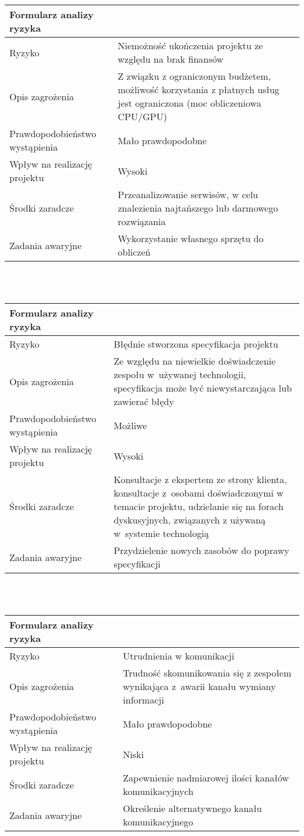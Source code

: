 \documentclass{article}
\begin{document}
\begin{tabular}{|L{6cm}|L{9cm}|}
\hline
Formularz analizy ryzyka &  \\
\hline
Ryzyko 						   & Niemożność ukończenia projektu ze względu na brak finansów \\
\hline
Opis zagrożenia				   & Z związku z ograniczonym budżetem, możliwość korzystania z płatnych usług jest ograniczona (moc obliczeniowa CPU/GPU) \\
\hline
Prawdopodobieństwo wystąpienia & Mało prawdopodobne \\
\hline
Wpływ na realizację projektu   & Wysoki \\
\hline
Środki zaradcze				   & Przeanalizowanie serwisów, w celu znalezienia najtańszego lub darmowego rozwiązania \\
\hline
Zadania awaryjne			   & Wykorzystanie własnego sprzętu do obliczeń \\
\hline
\end{tabular}

\mbox{}\\\mbox{}\\

\begin{tabular}{|L{6cm}|L{9cm}|}
\hline
Formularz analizy ryzyka &  \\
\hline
Ryzyko 						   & Błędnie stworzona specyfikacja projektu \\
\hline
Opis zagrożenia				   & Ze względu na niewielkie doświadczenie zespołu w~używanej technologii, specyfikacja może być niewystarczająca lub zawierać błędy \\
\hline
Prawdopodobieństwo wystąpienia & Możliwe \\
\hline
Wpływ na realizację projektu   & Wysoki \\
\hline
Środki zaradcze				   & Konsultacje z ekspertem ze strony klienta, konsultacje z~osobami doświadczonymi w temacie projektu, udzielanie się na forach dyskusyjnych, związanych z używaną w~systemie technologią \\
\hline
Zadania awaryjne			   & Przydzielenie nowych zasobów do poprawy specyfikacji \\
\hline
\end{tabular}

\mbox{}\\\mbox{}\\

\begin{tabular}{|L{6cm}|L{9cm}|}
\hline
Formularz analizy ryzyka &  \\
\hline
Ryzyko 						   & Utrudnienia w komunikacji \\
\hline
Opis zagrożenia				   & Trudność skomunikowania się z zespołem wynikająca z~awarii kanału wymiany informacji \\
\hline
Prawdopodobieństwo wystąpienia & Mało prawdopodobne \\
\hline
Wpływ na realizację projektu   & Niski \\
\hline
Środki zaradcze				   & Zapewnienie nadmiarowej ilości kanałów komunikacyjnych \\
\hline
Zadania awaryjne			   & Określenie alternatywnego kanału komunikacyjnego \\
\hline
\end{tabular}
\end{document}
